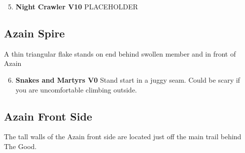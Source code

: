 \begin{enumerate}[]
	\setcounter{enumi}{4}
	\item\label{rt:Night Crawler} \colorbox{red!20}{\textbf{Night Crawler V10  } }
	\newline PLACEHOLDER\
\end{enumerate}
\subsection*{Azain Spire}\label{bf:Azain Spire}
A thin triangular flake stands on end behind swollen member and in front of Azain

\begin{enumerate}[]
	\setcounter{enumi}{5}
	\item\label{rt:Snakes and Martyrs} \colorbox{green!20}{\textbf{Snakes and Martyrs V0     } }
	\newline  Stand start in a juggy seam. Could be scary if you are uncomfortable climbing outside.\
\end{enumerate}
\subsection*{Azain Front Side}\label{bf:Azain Front Side}
The tall walls of the Azain front side are located just off the main trail behind The Good.

